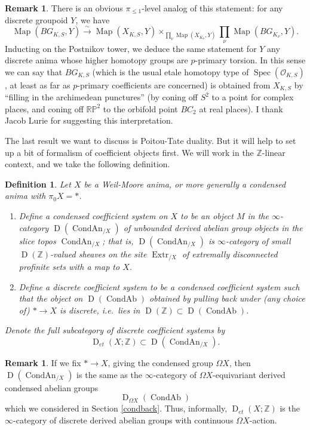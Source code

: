 \documentclass[12pt]{article}
\newtheorem{definition}[theorem]{Definition}
\theoremstyle{definition}
\newtheorem{remark}[theorem]{Remark}
\newcommand{\on}{\operatorname}
\newcommand{\mc}{\mathcal}
\newcommand{\mbb}{\mathbb}
\begin{document}
\begin{remark}
There is an obvious $\pi_{\leq 1}$-level analog of this statement: for any discrete groupoid $Y$, we have
$$\on{Map}(BG_{K,S},Y) \overset{\sim}{\rightarrow} \on{Map}(X_{K,S},Y)\times_{\prod_\nu\on{Map}(X_{K_\nu},Y)}\prod_\nu\on{Map}(BG_{K_\nu},Y).$$
Inducting on the Postnikov tower, we deduce the same statement for $Y$ any discrete anima whose higher homotopy groups are $p$-primary torsion.  In this sense we can say that $BG_{K,S}$ (which is the usual etale homotopy type of $\on{Spec}(\mc{O}_{K,S})$, at least as far as $p$-primary coefficients are concerned) is obtained from $X_{K,S}$ by ``filling in the archimedean punctures'' (by coning off $S^2$ to a point for complex places, and coning off $\mbb{R}\mbb{P}^2$ to the orbifold point $BC_2$ at real places).  I thank Jacob Lurie for suggesting this interpretation.
\end{remark}

The last result we want to discuss is Poitou-Tate duality.  But it will help to set up a bit of formalism of coefficient objects first.  We will work in the $\mbb{Z}$-linear context, and we take the following definition.

\begin{definition}
Let $X$ be a Weil-Moore anima, or more generally a condensed anima with $\pi_0X=\ast$.
\begin{enumerate}
\item Define a \emph{condensed coefficient system} on $X$ to be an object $M$ in the $\infty$-category $\on{D}(\on{CondAn}_{/X})$ of unbounded derived abelian group objects in the slice topos $\on{CondAn}_{/X}$; that is, $\on{D}(\on{CondAn}_{/X})$ is $\infty$-category of small $\on{D}(\mbb{Z})$-valued sheaves on the site $\on{Extr}_{/X}$ of extremally disconnected profinite sets with a map to $X$.
\item Define a \emph{discrete coefficient system} to be a condensed coefficient system such that the object on $\on{D}(\on{CondAb})$ obtained by pulling back under (any choice of) $\ast \to X$ is discrete, i.e.\ lies in $\on{D}(\mbb{Z})\subset\on{D}(\on{CondAb})$.
\end{enumerate}
Denote the full subcategory of discrete coefficient systems by
$$\on{D}_{et}(X;\mbb{Z}) \subset \on{D}(\on{CondAn}_{/X}).$$
\end{definition}

\begin{remark}
If we fix $\ast \to X$, giving the condensed group $\Omega X$, then $\on{D}(\on{CondAn}_{/X})$ is the same as the $\infty$-category of $\Omega X$-equivariant derived condensed abelian groups
$$\on{D}_{\Omega X}(\on{CondAb})$$
which we considered in Section \ref{condback}.  Thus, informally, $\on{D}_{et}(X;\mbb{Z})$ is the $\infty$-category of discrete derived abelian groups with continuous $\Omega X$-action.
\end{remark}
\end{document}
